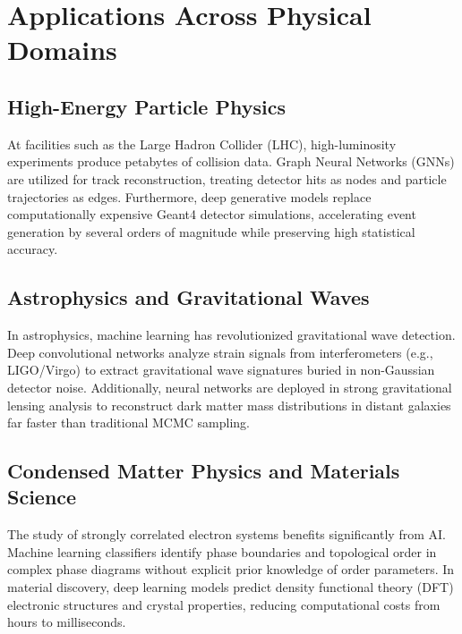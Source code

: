 \documentclass[11pt,a4paper]{article}
\begin{document}
\section{Applications Across Physical Domains}

\subsection{High-Energy Particle Physics}
At facilities such as the Large Hadron Collider (LHC), high-luminosity experiments produce petabytes of collision data. Graph Neural Networks (GNNs) are utilized for track reconstruction, treating detector hits as nodes and particle trajectories as edges. Furthermore, deep generative models replace computationally expensive Geant4 detector simulations, accelerating event generation by several orders of magnitude while preserving high statistical accuracy.

\subsection{Astrophysics and Gravitational Waves}
In astrophysics, machine learning has revolutionized gravitational wave detection. Deep convolutional networks analyze strain signals from interferometers (e.g., LIGO/Virgo) to extract gravitational wave signatures buried in non-Gaussian detector noise. Additionally, neural networks are deployed in strong gravitational lensing analysis to reconstruct dark matter mass distributions in distant galaxies far faster than traditional MCMC sampling.

\subsection{Condensed Matter Physics and Materials Science}
The study of strongly correlated electron systems benefits significantly from AI. Machine learning classifiers identify phase boundaries and topological order in complex phase diagrams without explicit prior knowledge of order parameters. In material discovery, deep learning models predict density functional theory (DFT) electronic structures and crystal properties, reducing computational costs from hours to milliseconds.
\end{document}
